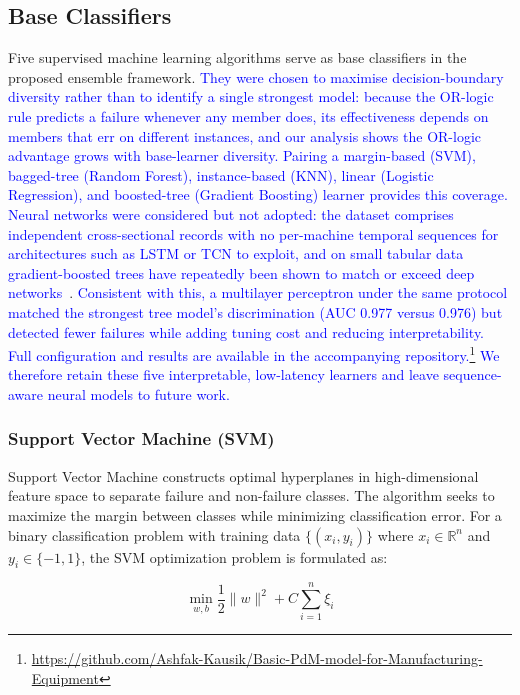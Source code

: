 \documentclass[final,5p, twocolumn]{elsarticle}
\begin{document}
\subsection{Base Classifiers}

Five supervised machine learning algorithms serve as base classifiers in the proposed ensemble framework. \textcolor{blue}{They were chosen to maximise decision-boundary diversity rather than to identify a single strongest model: because the OR-logic rule predicts a failure whenever any member does, its effectiveness depends on members that err on different instances, and our analysis shows the OR-logic advantage grows with base-learner diversity. Pairing a margin-based (SVM), bagged-tree (Random Forest), instance-based (KNN), linear (Logistic Regression), and boosted-tree (Gradient Boosting) learner provides this coverage. Neural networks were considered but not adopted: the dataset comprises independent cross-sectional records with no per-machine temporal sequences for architectures such as LSTM or TCN to exploit, and on small tabular data gradient-boosted trees have repeatedly been shown to match or exceed deep networks}~\cite{grinsztajn2022tree,shwartz2022tabular}. \textcolor{blue}{Consistent with this, a multilayer perceptron under the same protocol matched the strongest tree model's discrimination (AUC 0.977 versus 0.976) but detected fewer failures while adding tuning cost and reducing interpretability. Full configuration and results are available in the accompanying repository.\footnote{\url{https://github.com/Ashfak-Kausik/Basic-PdM-model-for-Manufacturing-Equipment}} We therefore retain these five interpretable, low-latency learners and leave sequence-aware neural models to future work.}

\subsubsection{Support Vector Machine (SVM)}

Support Vector Machine constructs optimal hyperplanes in high-dimensional feature space to separate failure and non-failure classes. The algorithm seeks to maximize the margin between classes while minimizing classification error. For a binary classification problem with training data $\{(x_i, y_i)\}$ where $x_i \in \mathbb{R}^n$ and $y_i \in \{-1, 1\}$, the SVM optimization problem is formulated as:

\begin{equation}
\min_{w,b} \frac{1}{2}\|w\|^2 + C\sum_{i=1}^{n}\xi_i
\end{equation}
\end{document}
